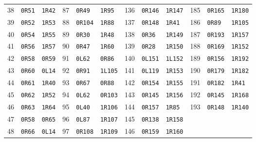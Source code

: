 \begin{center}
\begin{tabular}{rll@{\hspace{12pt}}rll@{\hspace{12pt}}rll@{\hspace{12pt}}rll}
38 & \texttt{0R51} & \texttt{1R42} & 87 & \texttt{0R49} & \texttt{1R95} & 136 & \texttt{0R146} & \texttt{1R147} & 185 & \texttt{0R165} & \texttt{1R180}\\
39 & \texttt{0R52} & \texttt{1R53} & 88 & \texttt{0R104} & \texttt{1R88} & 137 & \texttt{0R148} & \texttt{1R41} & 186 & \texttt{0R89} & \texttt{1R105}\\
40 & \texttt{0R54} & \texttt{1R55} & 89 & \texttt{0R30} & \texttt{1R48} & 138 & \texttt{0R36} & \texttt{1R149} & 187 & \texttt{0R193} & \texttt{1R157}\\
41 & \texttt{0R56} & \texttt{1R57} & 90 & \texttt{0R47} & \texttt{1R60} & 139 & \texttt{0R28} & \texttt{1R150} & 188 & \texttt{0R169} & \texttt{1R152}\\
42 & \texttt{0R58} & \texttt{0R59} & 91 & \texttt{0L62} & \texttt{0R86} & 140 & \texttt{0L151} & \texttt{1L152} & 189 & \texttt{0R156} & \texttt{1R192}\\
43 & \texttt{0R60} & \texttt{0L14} & 92 & \texttt{0R91} & \texttt{1L105} & 141 & \texttt{0L119} & \texttt{1R153} & 190 & \texttt{0R179} & \texttt{1R182}\\
44 & \texttt{0R61} & \texttt{1R40} & 93 & \texttt{0R67} & \texttt{0R88} & 142 & \texttt{0R154} & \texttt{1R155} & 191 & \texttt{0R182} & \texttt{1R41}\\
45 & \texttt{0R62} & \texttt{1R52} & 94 & \texttt{0L62} & \texttt{0R103} & 143 & \texttt{0R145} & \texttt{1R156} & 192 & \texttt{0R145} & \texttt{1R168}\\
46 & \texttt{0R63} & \texttt{1R64} & 95 & \texttt{0L40} & \texttt{1R106} & 144 & \texttt{0R157} & \texttt{1R85} & 193 & \texttt{0R148} & \texttt{1R140}\\
47 & \texttt{0R58} & \texttt{0R65} & 96 & \texttt{0L87} & \texttt{1R107} & 145 & \texttt{0R138} & \texttt{1R158} &  &  & \\
48 & \texttt{0R66} & \texttt{0L14} & 97 & \texttt{0R108} & \texttt{1R109} & 146 & \texttt{0R159} & \texttt{1R160} &  &  & \\
\bottomrule\end{tabular}\end{center}
\clearpage
